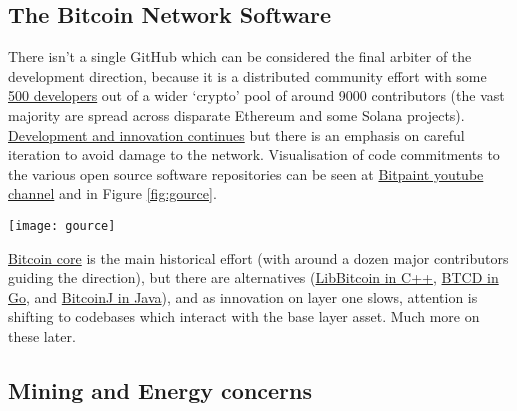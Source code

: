 \subsection{The Bitcoin Network Software}
There isn't a single GitHub which can be considered the final arbiter of the development direction, because it is a distributed community effort with some \href{https://decrypt.co/66740/who-are-the-fastest-growing-developer-communities-in-crypto}{500 developers} out of a wider `crypto' pool of around 9000 contributors (the vast majority are spread across disparate Ethereum and some Solana projects). \href{https://bitcoinops.org/en/newsletters/2021/12/22/}{Development and innovation continues} but there is an emphasis on careful iteration to avoid damage to the network. Visualisation of code commitments to the various open source software repositories can be seen at \href{https://www.youtube.com/channel/UC4DT4qudqogkmbqVAQy8eFg/videos}{Bitpaint youtube channel} and in Figure \ref{fig:gource}.\par
\begin{figure*}[ht]\centering %
	\texttt{[image: gource]}
	\caption{\href{https://github.com/bitpaint/bitcoin-gources}{Bitpaint}: Contributions to the Bitcoin ecosystem. Reused with permission.}
	\label{fig:gource}
\end{figure*}
\href{https://github.com/bitcoin/}{Bitcoin core} is the main historical effort (with around a dozen major contributors guiding the direction), but there are alternatives (\href{https://github.com/libbitcoin/libbitcoin-node/wiki}{LibBitcoin in C++}, \href{https://github.com/btcsuite/btcd}{BTCD in Go}, and \href{https://bitcoinj.github.io/getting-started}{BitcoinJ in Java}), and as innovation on layer one slows, attention is shifting to codebases which interact with the base layer asset. Much more on these later.
\subsection{Mining and Energy concerns}
